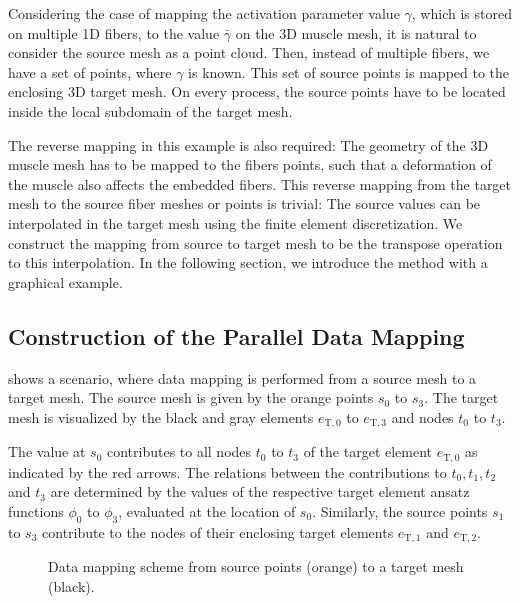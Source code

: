 Considering the case of mapping the activation parameter value $\gamma$, which is stored on multiple 1D fibers, to the value $\bar{\gamma}$ on the 3D muscle mesh, it is natural to consider the source mesh as a point cloud. Then, instead of multiple fibers, we have a set of points, where $\gamma$ is known. This set of source points is mapped to the enclosing 3D target mesh. On every process, the source points have to be located inside the local subdomain of the target mesh.

The reverse mapping in this example is also required: The geometry of the 3D muscle mesh has to be mapped to the fibers points, such that a deformation of the muscle also affects the embedded fibers. This reverse mapping from the target mesh to the source fiber meshes or points is trivial: The source values can be interpolated in the target mesh using the finite element discretization.
We construct the mapping from source to target mesh to be the transpose operation to this interpolation. In the following section, we introduce the method with a graphical example.

\subsection{Construction of the Parallel Data Mapping}

 shows a scenario, where data mapping is performed from a source mesh to a target mesh. The source mesh is given by the orange points $s_0$ to $s_3$. The target mesh is visualized by the black and gray elements $e_{\text{T},0}$ to $e_{\text{T},3}$  and nodes $t_0$ to $t_3$.

The value at $s_0$ contributes to all nodes $t_0$ to $t_3$ of the target element $e_{\text{T},0}$ as indicated by the red arrows. The relations between the contributions to $t_0,t_1,t_2$ and $t_3$ are determined by the values of the respective target element ansatz functions $\phi_0$ to $\phi_3$, evaluated at the location of $s_0$.
Similarly, the source points $s_1$ to $s_3$ contribute to the nodes of their enclosing target elements $e_{\text{T},1}$ and $e_{\text{T},2}$. 

\begin{figure}%
  \centering%
  \def\svgwidth{0.4\textwidth}
  \caption{Data mapping scheme from source points (orange) to a target mesh (black).}%
  \label{fig:mapping_between_meshes_2}%
\end{figure}%

